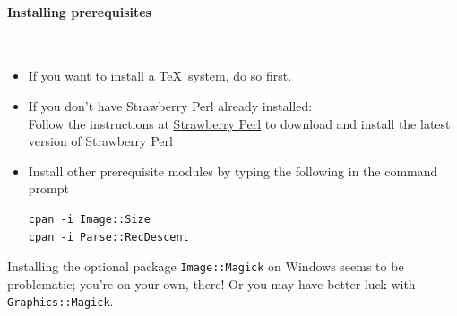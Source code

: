 \documentclass{article}
\begin{document}
\paragraph{Installing prerequisites}\label{install.windows.prerequisites}\\
\begin{itemize}
\item If you want to install a \TeX\ system, do so first.
\item If you don't have Strawberry Perl already installed:\\
   Follow the instructions at \href{http://strawberryperl.com}{Strawberry Perl}
   to download and install the latest version of Strawberry Perl\\
\item Install other prerequisite modules by typing the following in the command prompt
\begin{lstlisting}[style=shell]
cpan -i Image::Size
cpan -i Parse::RecDescent
\end{lstlisting}
\end{itemize}
Installing the optional package \texttt{Image::Magick} on Windows seems to be problematic;
you're on your own, there!
Or you may  have better luck with \texttt{Graphics::Magick}.
\end{document}
